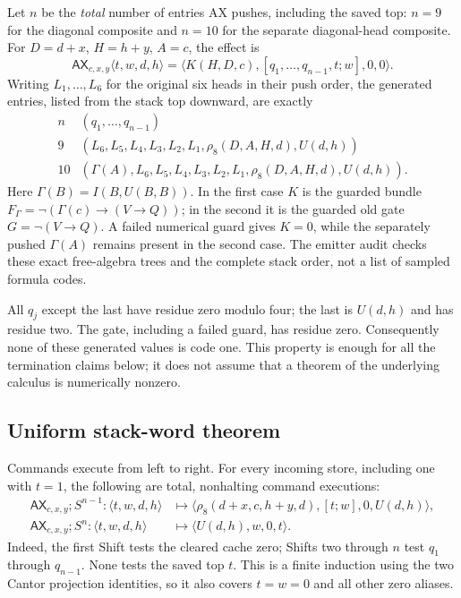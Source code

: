 Let $n$ be the \emph{total} number of entries AX pushes, including the
saved top: $n=9$ for the diagonal composite and $n=10$ for the separate
diagonal-head composite. For $D=d+x$, $H=h+y$, $A=c$, the effect is
\[
 \mathsf{AX}_{c,x,y}\langle t,w,d,h\rangle
 =\langle K(H,D,c),[q_1,\ldots,q_{n-1},t;w],0,0\rangle.
\]
Writing $L_1,\ldots,L_6$ for the original six heads in their push order,
the generated entries, listed from the stack top downward, are exactly
\[
\begin{array}{c|l}
n& (q_1,\ldots,q_{n-1})\\ \hline
9&(L_6,L_5,L_4,L_3,L_2,L_1,\rho_8(D,A,H,d),U(d,h))\\
10&(\Gamma(A),L_6,L_5,L_4,L_3,L_2,L_1,
                 \rho_8(D,A,H,d),U(d,h)).
\end{array}
\]
Here $\Gamma(B)=I(B,U(B,B))$. In the first case $K$ is the guarded
bundle $F_\Gamma=\neg(\Gamma(c)\to(V\to Q))$; in the second it is
the guarded old gate $G=\neg(V\to Q)$. A failed numerical guard gives
$K=0$, while the separately pushed $\Gamma(A)$ remains present in the
second case. The emitter audit checks these exact free-algebra trees and
the complete stack order, not a list of sampled formula codes.

All $q_j$ except the last have residue zero modulo four; the last is
$U(d,h)$ and has residue two. The gate, including a failed guard, has
residue zero. Consequently none of these generated values is code one.
This property is enough for all the termination claims below; it does not
assume that a theorem of the underlying calculus is numerically nonzero.

\subsection{Uniform stack-word theorem}

Commands execute from left to right. For every incoming store, including
one with $t=1$, the following are total, nonhalting command executions:
\begin{align*}
 \mathsf{AX}_{c,x,y};S^{n-1}:
 \langle t,w,d,h\rangle
 &\longmapsto
 \langle\rho_8(d+x,c,h+y,d),[t;w],0,U(d,h)\rangle,\\
 \mathsf{AX}_{c,x,y};S^n:
 \langle t,w,d,h\rangle
 &\longmapsto \langle U(d,h),w,0,t\rangle.
\end{align*}
Indeed, the first Shift tests the cleared cache zero; Shifts two through
$n$ test $q_1$ through $q_{n-1}$. None tests the saved top $t$. This is
a finite induction using the two Cantor projection identities, so it also
covers $t=w=0$ and all other zero aliases.

